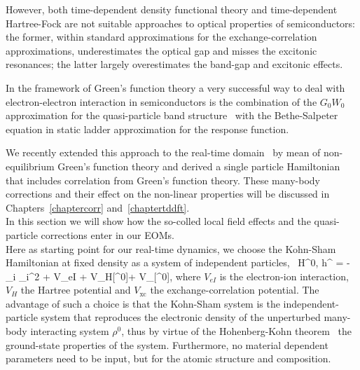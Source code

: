 However, both time-dependent density functional theory and time-dependent Hartree-Fock are not suitable approaches to optical properties of semiconductors: the former, within standard approximations for the exchange-correlation approximations, underestimates the optical gap and misses the excitonic resonances; the latter largely overestimates the band-gap and excitonic effects.   

In the framework of Green's function theory a very successful way to deal with electron-electron interaction in semiconductors is the combination of the $G_0W_0$ approximation for the quasi-particle band structure~\cite{PhysRevB.25.2867} with the Bethe-Salpeter equation in static ladder approximation for the response function.~\cite{strinati}  

We recently extended this approach to the real-time domain~\cite{attaccalite} by mean of non-equilibrium Green's function theory and derived a single particle Hamiltonian that includes correlation from Green's function theory. These many-body corrections and their effect on the non-linear properties will be discussed in Chapters~\ref{chaptercorr} and~\ref{chaptertddft}.\\
In this section we will show how the so-colled local field effects and the quasi-particle corrections enter in our EOMs.\\
Here as starting point for our real-time dynamics, we choose the Kohn-Sham  Hamiltonian at fixed density as a system of independent particles,~\cite{PhysRev.140.A1133} 
\be
\hat H^{0,} \equiv \hat h^{} = -\sum_{i} \nabla_i^2 + \hat V_{eI} + \hat V_{H}[\rho^0]+ \hat V_{}[\rho^0],      
\label{eq:HIPA}
\ee
where $V_{eI}$ is the electron-ion interaction, $V_{H}$ the Hartree potential and $V_{\text{xc}}$ the exchange-correlation potential.
The advantage of such a choice is that the Kohn-Sham system is the independent-particle system that reproduces the electronic density of the unperturbed many-body interacting system $\rho^0$, thus by virtue of the Hohenberg-Kohn theorem~\cite{PhysRev.136.B864} the ground-state properties of the system. Furthermore, no material dependent parameters need to be input, but for the atomic structure and composition. 

